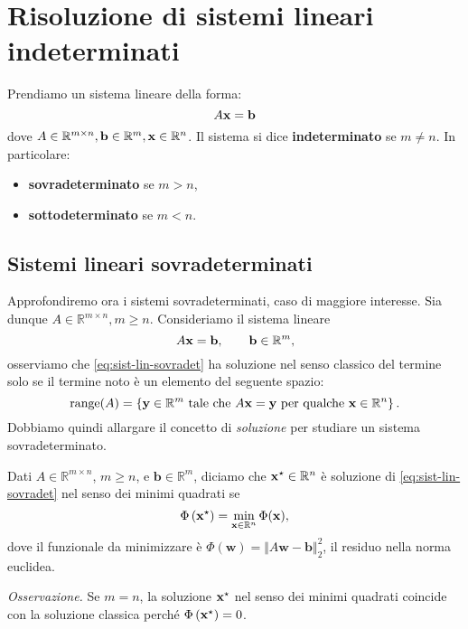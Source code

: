 
\chapter{Risoluzione di sistemi lineari indeterminati}

Prendiamo un sistema lineare della forma:
\begin{equation*}
A\mathbf{x} =\mathbf{b}
\end{equation*}
dove $A\in \mathbb{R}^{m\times n} ,\mathbf{b} \in \mathbb{R}^{m} ,\mathbf{x} \in \mathbb{R}^{n}$. Il sistema si dice \textbf{indeterminato} se $m\ne n$. In particolare:
\begin{itemize}
\item \textbf{sovradeterminato} se $m >n$,
\item \textbf{sottodeterminato} se $m< n$.
\end{itemize}

\section{Sistemi lineari sovradeterminati}
Approfondiremo ora i sistemi sovradeterminati, caso di maggiore interesse.
Sia dunque $A\in \mathbb{R}^{m\times n} ,m\geqslant n$.
Consideriamo il sistema lineare
\begin{equation}
A\mathbf{x} =\mathbf{b} ,\qquad\mathbf{b} \in \mathbb{R}^{m},
\label{eq:sist-lin-sovradet}
\end{equation}
osserviamo che \eqref{eq:sist-lin-sovradet} ha soluzione nel senso classico del termine solo se il termine noto è un elemento del seguente spazio:
\begin{equation*}
\operatorname{range}(A) =\left\{\mathbf{y} \in \mathbb{R}^{m} \ \text{tale che} \ A\mathbf{x} =\mathbf{y} \ \text{per qualche} \ \mathbf{x} \in \mathbb{R}^{n}\right\}.
\end{equation*}
Dobbiamo quindi allargare il concetto di \textit{soluzione} per studiare un sistema sovradeterminato.
\begin{definition}
Dati $A\in \mathbb{R}^{m\times n}$, $m\geqslant n$, e $\mathbf{b} \in \mathbb{R}^{m}$, diciamo che $\mathbf{x}^{\star } \in \mathbb{R}^{n}$ è soluzione di \eqref{eq:sist-lin-sovradet} nel senso dei minimi quadrati se
\begin{equation*}
\Phi \left(\mathbf{x}^{\star }\right) =\min_{\mathbf{x} \in \mathbb{R}^{n}} \Phi (\mathbf{x}),
\end{equation*}
dove il funzionale da minimizzare è $\Phi (\mathbf{w}) =\Vert A\mathbf{w} -\mathbf{b}\Vert ^{2}_{2}$, il residuo nella norma euclidea.
\end{definition}
\textit{Osservazione.} Se $m=n$, la soluzione $\mathbf{x}^{\star }$ nel senso dei minimi quadrati coincide con la soluzione classica perché $\Phi \left(\mathbf{x}^{\star }\right) =0$.

